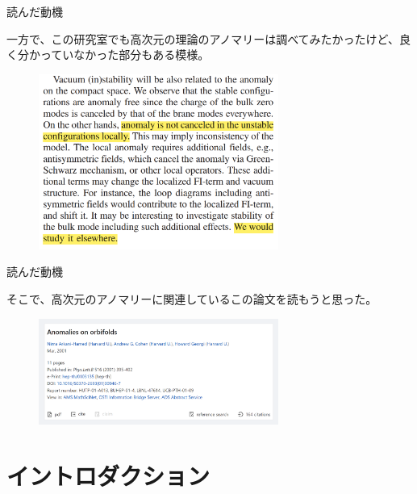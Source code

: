 \documentclass[
  unicode,a4paper,10pt,
  xcolor = {dvipsnames,svgnames},
  hyperref ={colorlinks=true,citecolor=Navy,linkcolor=NavyBlue,urlcolor=purple},
  ja=standard,lualatex
]{beamer}
\begin{document}
\begin{frame}{読んだ動機}

  一方で、この研究室でも高次元の理論のアノマリーは調べてみたかったけど、良く分かっていなかった部分もある模様。
  \begin{figure}[ht]
    \centering
    \includegraphics[width=0.7\textwidth]{fig/Abe2020vmv.png}
    \cite{Abe:2020vmv}    
  \end{figure}

\end{frame}


\begin{frame}{読んだ動機}

  そこで、高次元のアノマリーに関連しているこの論文を読もうと思った。
  \begin{figure}[ht]
    \centering
    \includegraphics[width=0.7\textwidth]{fig/Arkani-Hamed2001uol.png}
  \end{figure}

\end{frame}


\section{イントロダクション}

\begin{frame}
  \huge \secname
\end{frame}
\end{document}
